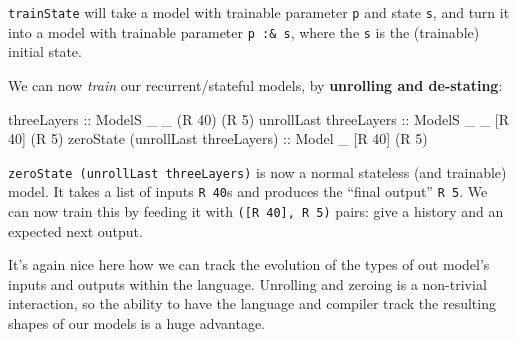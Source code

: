 \documentclass[]{article}
\newenvironment{Shaded}{}{}
\newcommand{\CommentTok}[1]{\textcolor[rgb]{0.38,0.63,0.69}{\textit{#1}}}
\newcommand{\DataTypeTok}[1]{\textcolor[rgb]{0.56,0.13,0.00}{#1}}
\newcommand{\DecValTok}[1]{\textcolor[rgb]{0.25,0.63,0.44}{#1}}
\newcommand{\FunctionTok}[1]{\textcolor[rgb]{0.02,0.16,0.49}{#1}}
\newcommand{\NormalTok}[1]{#1}
\newcommand{\OtherTok}[1]{\textcolor[rgb]{0.00,0.44,0.13}{#1}}
\begin{document}
\begin{Shaded}
\end{Shaded}

\texttt{trainState} will take a model with trainable parameter \texttt{p} and
state \texttt{s}, and turn it into a model with trainable parameter
\texttt{p\ :\&\ s}, where the \texttt{s} is the (trainable) initial state.

We can now \emph{train} our recurrent/stateful models, by \textbf{unrolling and
de-stating}:

\begin{Shaded}
\begin{Highlighting}[]
\OtherTok{threeLayers                        ::} \DataTypeTok{ModelS}\NormalTok{ _ _ (}\DataTypeTok{R} \DecValTok{40}\NormalTok{) (}\DataTypeTok{R} \DecValTok{5}\NormalTok{)}
\NormalTok{unrollLast}\OtherTok{ threeLayers             ::} \DataTypeTok{ModelS}\NormalTok{ _ _ [}\DataTypeTok{R} \DecValTok{40}\NormalTok{] (}\DataTypeTok{R} \DecValTok{5}\NormalTok{)}
\NormalTok{zeroState (unrollLast threeLayers)}\OtherTok{ ::} \DataTypeTok{Model}\NormalTok{  _   [}\DataTypeTok{R} \DecValTok{40}\NormalTok{] (}\DataTypeTok{R} \DecValTok{5}\NormalTok{)}
\end{Highlighting}
\end{Shaded}

\texttt{zeroState\ (unrollLast\ threeLayers)} is now a normal stateless (and
trainable) model. It takes a list of inputs \texttt{R\ 40}s and produces the
``final output'' \texttt{R\ 5}. We can now train this by feeding it with
\texttt{({[}R\ 40{]},\ R\ 5)} pairs: give a history and an expected next output.

It's again nice here how we can track the evolution of the types of out model's
inputs and outputs within the language. Unrolling and zeroing is a non-trivial
interaction, so the ability to have the language and compiler track the
resulting shapes of our models is a huge advantage.
\end{document}
